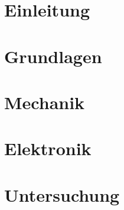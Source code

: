 \documentclass[
    abteilunga,         %
    english,ngerman     %
]{tudfp}                %
\begin{document}
\maketitle

\tableofcontents
\cleardoublepage

\section{Einleitung}


\section{Grundlagen}


\section{Mechanik}


\section{Elektronik}


\section{Untersuchung}



%


%


\nocite{*} %
\printbibliography[heading=bibnumbered]


%


\end{document}
